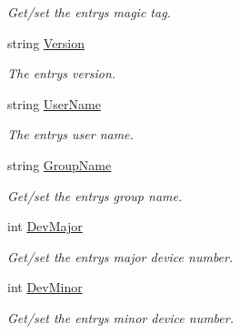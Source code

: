 \begin{DoxyCompactItemize}
\begin{DoxyCompactList}\small\item\em Get/set the entry\textquotesingle{}s magic tag. \end{DoxyCompactList}\item 
string \hyperlink{class_i_c_sharp_code_1_1_sharp_zip_lib_1_1_tar_1_1_tar_header_a1c4dc61a04e28e9073cfea713e130d0c}{Version}
\begin{DoxyCompactList}\small\item\em The entry\textquotesingle{}s version. \end{DoxyCompactList}\item 
string \hyperlink{class_i_c_sharp_code_1_1_sharp_zip_lib_1_1_tar_1_1_tar_header_a370a6b84d12d9e44bf68d429c9fc425a}{User\+Name}
\begin{DoxyCompactList}\small\item\em The entry\textquotesingle{}s user name. \end{DoxyCompactList}\item 
string \hyperlink{class_i_c_sharp_code_1_1_sharp_zip_lib_1_1_tar_1_1_tar_header_a3953a2b87084b00531b8a57942039b9d}{Group\+Name}
\begin{DoxyCompactList}\small\item\em Get/set the entry\textquotesingle{}s group name. \end{DoxyCompactList}\item 
int \hyperlink{class_i_c_sharp_code_1_1_sharp_zip_lib_1_1_tar_1_1_tar_header_aa33d4b050f4120cfe81b2d8cc29fdf02}{Dev\+Major}
\begin{DoxyCompactList}\small\item\em Get/set the entry\textquotesingle{}s major device number. \end{DoxyCompactList}\item 
int \hyperlink{class_i_c_sharp_code_1_1_sharp_zip_lib_1_1_tar_1_1_tar_header_a992aeb38305a61c0b4c2928497154e4f}{Dev\+Minor}
\begin{DoxyCompactList}\small\item\em Get/set the entry\textquotesingle{}s minor device number. \end{DoxyCompactList}\end{DoxyCompactItemize}


